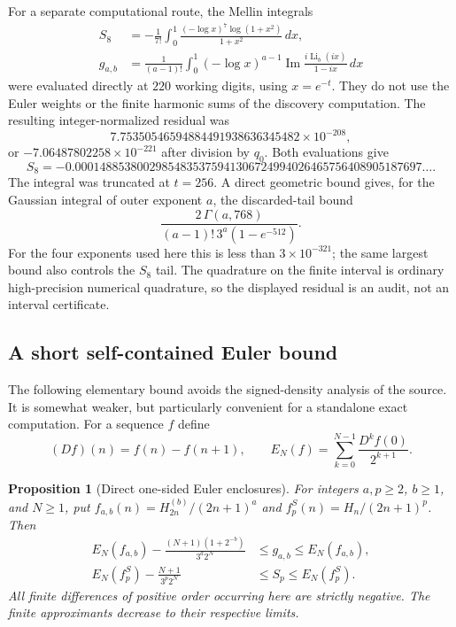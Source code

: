 \documentclass[11pt,letterpaper]{article}
\numberwithin{equation}{section}
\theoremstyle{plain}
\newtheorem{proposition}[theorem]{Proposition}
\theoremstyle{definition}
\theoremstyle{remark}
\DeclareMathOperator{\Li}{Li}
\begin{document}
For a separate computational route, the Mellin integrals
\begin{align}
 S_8&=-\frac1{7!}\int_0^1
       \frac{(-\log x)^7\log(1+x^2)}{1+x^2}\,dx,
       \label{cont26:eq:s8-mellin}\\
 g_{a,b}&=\frac1{(a-1)!}\int_0^1(-\log x)^{a-1}
       \operatorname{Im}\frac{i\Li_b(ix)}{1-ix}\,dx
       \label{cont26:eq:gab-mellin}
\end{align}
were evaluated directly at $220$ working digits, using $x=e^{-t}$.
They do not use the Euler weights or the finite harmonic sums of the
discovery computation. The resulting integer-normalized residual was
\[
 7.75350546594884491938636345482\times10^{-208},
\]
or $-7.06487802258\times10^{-221}$ after division by $q_0$.
Both evaluations give
\[
 S_8=-0.00014885380029854835375941306724994026465756408905187697\ldots.
\]
The integral was truncated at $t=256$. A direct geometric bound gives,
for the Gaussian integral of outer exponent $a$, the discarded-tail bound
\[
 \frac{2\,\Gamma(a,768)}{(a-1)!\,3^a(1-e^{-512})}.
\]
For the four exponents used here this is less than $3\times10^{-321}$;
the same largest bound also controls the $S_8$ tail. The quadrature on
the finite interval is ordinary high-precision numerical quadrature,
so the displayed residual is an audit, not an interval certificate.

\subsection{A short self-contained Euler bound}
The following elementary bound avoids the signed-density analysis of
the source. It is somewhat weaker, but particularly convenient for a
standalone exact computation.
For a sequence $f$ define
\[
 (Df)(n)=f(n)-f(n+1),\qquad
 E_N(f)=\sum_{k=0}^{N-1}\frac{D^kf(0)}{2^{k+1}}.
\]

\begin{proposition}[Direct one-sided Euler enclosures]
\label{cont26:prop:direct-euler}
For integers $a,p\geq2$, $b\geq1$, and $N\geq1$, put
$f_{a,b}(n)=H_{2n}^{(b)}/(2n+1)^a$ and
$f_p^S(n)=H_n/(2n+1)^p$. Then
\begin{align}
 E_N(f_{a,b})-
 \frac{(N+1)(1+2^{-b})}{3^a2^N}
 &\leq g_{a,b}\leq E_N(f_{a,b}),
 \label{cont26:eq:direct-g-bound}\\
 E_N(f_p^S)-\frac{N+1}{3^p2^N}
 &\leq S_p\leq E_N(f_p^S).
 \label{cont26:eq:direct-s-bound}
\end{align}
All finite differences of positive order occurring here are strictly
negative. The finite approximants decrease to their respective limits.
\end{proposition}
\end{document}
